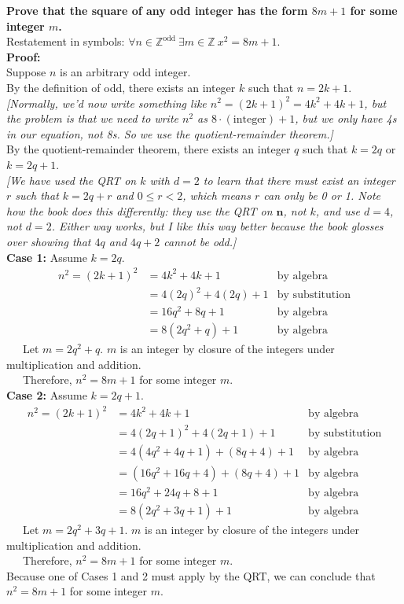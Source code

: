 \documentclass{article}
\newcommand{\Z}{\mathbb{Z}}
\begin{document}
\textbf{Prove that the square of any odd integer has the form $8m+1$ for some integer $m$.}
\\

Restatement in symbols: $\forall n \in \Z^{\text{odd}} \ \exists m \in \Z \ x^2=8m+1$.
\\

\textbf{Proof:} \\

Suppose $n$ is an arbitrary odd integer. \\

By the definition of odd, there exists an integer $k$ such that $n=2k+1$.\\

 \textit{[Normally, we'd now write something like $n^2 = (2k+1)^2 = 4k^2+4k+1$, but the problem is that we need
 to write $n^2$ as $8\cdot(\text{integer})+1$, but we only have 4s in our equation, not 8s.  So we use the quotient-remainder
 theorem.]}\\

By the quotient-remainder theorem, there exists an integer $q$ such that $k=2q$ or $k=2q+1$.\\

\textit{[We have used the QRT on $k$ with $d=2$ to learn that there must exist an integer $r$ such that $k=2q+r$ and $0 \leq r < 2$,
which means $r$ can only be 0 or 1.  Note how the book does this differently: they use the QRT on $\textbf{n}$, not $k$, and use
$d=4$, not $d=2$.  Either way works, but I like this way better because the book glosses over showing that $4q$ and $4q+2$ cannot
be odd.]} \\

\textbf{Case 1:} Assume $k=2q$. 
\begin{align*} 
	n^2 = (2k+1)^2 &= 4k^2+4k+1 & \text{by algebra} \\
	&= 4(2q)^2 + 4(2q) +1 &\text{by substitution} \\
	&= 16q^2 + 8q +1 &\text{by algebra} \\
	&= 8(2q^2 +q)+1&\text{by algebra}
\end{align*}
\ \ \ Let $m=2q^2+q$.  $m$ is an integer by closure of the integers under multiplication and addition. \\

\ \ \ Therefore, $n^2=8m+1$ for some integer $m$.\\

\textbf{Case 2:} Assume $k=2q+1$. 
\begin{align*} 
	n^2 = (2k+1)^2 &= 4k^2+4k+1 & \text{by algebra} \\
	&= 4(2q+1)^2 + 4(2q+1) +1 &\text{by substitution} \\
	&= 4(4q^2 + 4q + 1) + (8q+4) +1 &\text{by algebra} \\
	&= (16q^2 + 16q + 4) + (8q+4) +1 &\text{by algebra} \\
	&= 16q^2 + 24q + 8 +1 &\text{by algebra} \\
	&= 8(2q^2 + 3q + 1)+1&\text{by algebra}
\end{align*}
\ \ \ Let $m=2q^2+3q+1$.  $m$ is an integer by closure of the integers under multiplication and addition. \\

\ \ \ Therefore, $n^2=8m+1$ for some integer $m$.\\

Because one of Cases 1 and 2 must apply by the QRT, we can conclude that $n^2 = 8m+1$ for some integer $m$.
\end{document}
